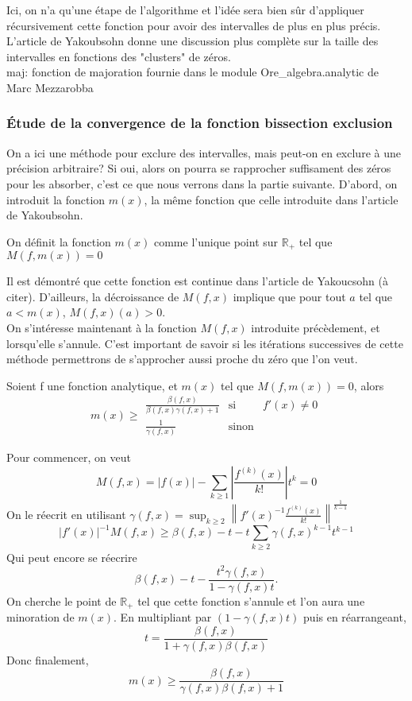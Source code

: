 \documentclass[a4paper,10.5pt]{article}
\begin{document}
	\noindent Ici, on n'a qu'une étape de l'algorithme et l'idée sera bien sûr d'appliquer récursivement cette fonction pour avoir des intervalles de plus en plus précis. L'article de Yakoubsohn donne une discussion plus complète sur la taille des intervalles en fonctions des "clusters" de zéros.\\
	\noindent maj: fonction de majoration fournie dans le module Ore\_algebra.analytic de Marc Mezzarobba\\
	
	\subsubsection{Étude de la convergence de la fonction bissection exclusion}
	On a ici une méthode pour exclure des intervalles, mais peut-on en exclure à une précision arbitraire? Si oui, alors on pourra se rapprocher suffisament des zéros pour les absorber, c'est ce que nous verrons dans la partie suivante. D'abord, on introduit la fonction $m(x)$, la même fonction que celle introduite dans l'article de Yakoubsohn.
	\begin{definition}
		On définit la fonction $m(x)$ comme l'unique point sur $\mathbb{R}_+$ tel que $M(f,m(x))=0$ 
	\end{definition} 
	Il est démontré que cette fonction est continue dans l'article de Yakoucsohn (à citer). 
	D'ailleurs, la décroissance de $M(f,x)$ implique que pour tout $a$ tel que $a<m(x)$, $M(f,x)(a)>0$.\\
	On s'intéresse maintenant à la fonction $M(f,x)$ introduite précèdement, et lorsqu'elle s'annule. C'est important de savoir si les itérations successives de cette méthode permettrons de s'approcher aussi proche du zéro que l'on veut.
	\begin{theorem}
		Soient f une fonction analytique, et $m(x)$ tel que $M(f,m(x))=0$, alors
		\begin{equation}
		m(x)\geq
		\begin{array}{ccc}
		\frac{\beta(f,x)}{\beta(f,x)\gamma(f,x)+1} & \mbox{si} & f'(x)\neq 0\\
		\frac{1}{\gamma(f,x)} & \mbox{sinon}
		\end{array}
		\end{equation}
	\end{theorem}
	\begin{demonstration}
	
	Pour commencer, on veut  
	\[M(f,x)=|f(x)|-\sum_{k\geq1}|\frac{f^{(k)}(x)}{k!}|t^{k}=0\]
	On le réecrit en utilisant $\gamma(f,x)=\sup_{k \geq 2}\left\|f'(x)^{-1}\frac{f^{(k)}(x)}{k!}\right\|^{\frac{1}{k-1}}$
	\[|f'(x)|^{-1}M(f,x)\geq \beta(f,x)-t-t\sum_{k\geq2}\gamma(f,x)^{k-1}t^{k-1}\]
	Qui peut encore se réecrire
	\[\beta(f,x)-t-\frac{t^2\gamma(f,x)}{1-\gamma(f,x) t}.\]
	On cherche le point de $\mathbb{R}_+$ tel que cette fonction s'annule et l'on aura une minoration de $m(x)$. En multipliant par $(1-\gamma(f,x) t)$ puis en réarrangeant,
	\[t=\frac{\beta(f,x)}{1+\gamma(f,x) \beta(f,x)}\]
	Donc finalement,
	\[m(x)\geq\frac{\beta(f,x)}{\gamma(f,x) \beta(f,x)+1} \]
	\end{demonstration}
\end{document}
